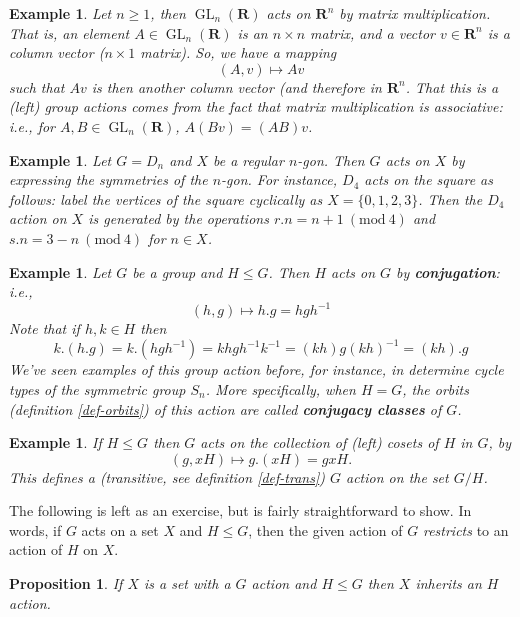 \documentclass[12pt]{article}
\numberwithin{equation}{subsection}
\newtheorem{prop}[subsection]{Proposition}
\theoremstyle{note}
\newtheorem{example}[subsection]{Example}
\newcommand{\Mod}[1]{\ (\mathrm{mod}\ #1)}
\newcommand{\GL}{\operatorname{GL}}
\begin{document}
\begin{example} \label{GL-action}
	Let $n\geq 1$, then $\GL_n(\mathbf{R})$ acts on $\mathbf{R}^n$ by matrix multiplication. That is, an element $A\in \GL_n(\mathbf{R})$ is an $n\times n$ matrix, and a vector $v\in \mathbf{R}^n$ is a column vector ($n\times 1$ matrix). So, we have a mapping \[ (A,v)\mapsto Av\] such that $Av$ is then another column vector (and therefore in $\mathbf{R}^n$. That this is a (left) group actions comes from the fact that matrix multiplication  is associative: i.e., for $A,B\in \GL_n(\mathbf{R})$, $A(Bv)=(AB)v$.
\end{example}

\begin{example}
	Let $G=D_n$ and $X$ be a regular $n$-gon. Then $G$ acts on $X$ by expressing the symmetries of the $n$-gon. For instance, $D_4$ acts on the square as follows: label the vertices of the square cyclically as $X=\{0,1,2,3\}$. Then the $D_4$ action on $X$ is generated by the operations $r.n=n+1\Mod{4}$ and $s.n=3-n\Mod{4}$ for $n\in X$.
\end{example}

\begin{example}
	Let $G$ be a group and $H\leq G$. Then $H$ acts on $G$ by \textbf{conjugation}: i.e., \begin{equation} (h,g)\mapsto h.g=hgh^{-1}\end{equation} Note that if $h,k\in H$ then \[ k.(h.g)=k.(hgh^{-1})=khgh^{-1}k^{-1}=(kh)g(kh)^{-1}=(kh).g\]
	We've seen examples of this group action before, for instance, in determine cycle types of the symmetric group $S_n$. More specifically, when $H=G$, the orbits (definition \ref{def-orbits}) of this action are called \textbf{conjugacy classes} of $G$. 
\end{example}

\begin{example}
	If $H\leq G$ then $G$ acts on the collection of (left) cosets of $H$ in $G$, by \[(g, xH)\mapsto g.(xH)=gxH.\] This defines a  (transitive, see definition \ref{def-trans}) $G$ action on the set $G/H$. 
\end{example}

The following is left as an exercise, but is fairly straightforward to show. In words, if $G$ acts on a set $X$ and $H\leq G$, then the given action of $G$ \textit{restricts} to an action of $H$ on $X$. 

\begin{prop} \label{restricted-action}
	If $X$ is a set with a $G$ action and $H\leq G$ then $X$ inherits an $H$ action. 
\end{prop}
\end{document}
